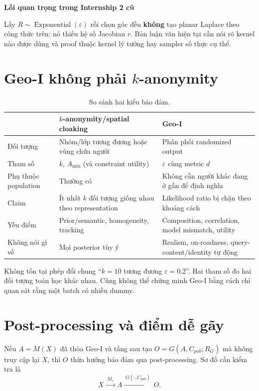 \documentclass[11pt,a4paper,oneside]{report}
\newenvironment{warningbox}[1][Cẩn thận]{%
  \par\medskip\noindent\begin{lrbox}{\warningstore}\begin{minipage}{.89\textwidth}
  {\sffamily\bfseries\color{red}#1}\par\smallskip}{%
  \end{minipage}\end{lrbox}\begin{center}\setlength{\fboxsep}{7pt}%
  \fcolorbox{red}{lightred}{\usebox{\warningstore}}\end{center}\medskip}
\begin{document}
\begin{warningbox}[Lỗi quan trọng trong Internship 2 cũ]
Lấy $R\sim\operatorname{Exponential}(\varepsilon)$ rồi chọn góc đều \textbf{không}
tạo planar Laplace theo công thức trên: nó thiếu hệ số Jacobian $r$. Bản luận văn
hiện tại cần nói rõ kernel nào được dùng và proof thuộc kernel lý tưởng hay sampler
số thực cụ thể.
\end{warningbox}

\section{Geo-I không phải \texorpdfstring{$k$}{k}-anonymity}

\begin{table}[htbp]
\centering
\small
\caption{So sánh hai kiểu bảo đảm.}
\label{tab:k-vs-geoi}
\begin{tabularx}{\textwidth}{P{3.2cm}Y Y}
\toprule
 & \textbf{$k$-anonymity/spatial cloaking} & \textbf{Geo-I}\\
\midrule
Đối tượng & Nhóm/lớp tương đương hoặc vùng chứa người & Phân phối randomized output\\
Tham số & $k$, $A_{\min}$ (và constraint utility) & $\varepsilon$ cùng metric $d$\\
Phụ thuộc population & Thường có & Không cần người khác đang ở gần để định nghĩa\\
Claim & Ít nhất $k$ đối tượng giống nhau theo representation & Likelihood ratio bị chặn theo khoảng cách\\
Yếu điểm & Prior/semantic, homogeneity, tracking & Composition, correlation, model mismatch, utility\\
Không nói gì về & Mọi posterior tùy ý & Realism, on-roadness, query-content/identity tự động\\
\bottomrule
\end{tabularx}
\end{table}

Không tồn tại phép đổi chung ``$k=10$ tương đương $\varepsilon=0.2$''. Hai tham số
đo hai đối tượng toán học khác nhau. Cũng không thể chứng minh Geo-I bằng cách
chỉ quan sát rằng một batch có nhiều dummy.

\section{Post-processing và điểm dễ gãy}

Nếu $A=M(X)$ đã thỏa Geo-I và tầng sau tạo $O=G(A,C_{pub};R_G)$ mà không truy cập
lại $X$, thì $O$ thừa hưởng bảo đảm qua post-processing. Sơ đồ cần kiểm tra là
\[
X\xrightarrow{\;M_{\varepsilon}\;}A
\xrightarrow{\;G(\cdot,C_{pub})\;}O.
\]
\end{document}
